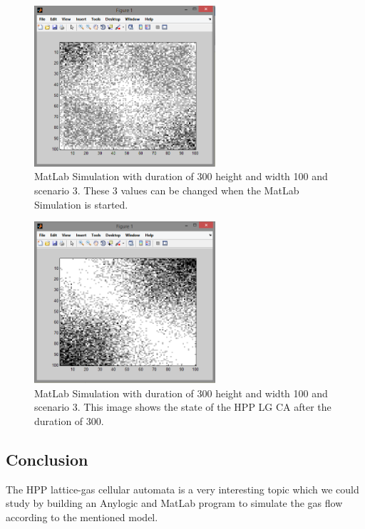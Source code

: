 \documentclass[paper=a4, fontsize=11pt]{scrartcl} %
\numberwithin{equation}{section} %
\numberwithin{figure}{section} %
\numberwithin{table}{section} %
\begin{document}
\begin{figure}[!htp]
	\centering
		\includegraphics[width=0.60\textwidth]{Screenshots/MatLab-300-100-100-3-Start.PNG}
	\caption[MatLab Example 1 - Start]{MatLab Simulation with duration of 300 height and width 100 and scenario 3. These 3 values can be changed when the MatLab Simulation is started.}
	\label{fig:matlab-example1-start}
\end{figure}

\begin{figure}[!htp]
	\centering
		\includegraphics[width=0.60\textwidth]{Screenshots/MatLab-300-100-100-3-End.PNG}
	\caption[MatLab Example 1 - End]{MatLab Simulation with duration of 300 height and width 100 and scenario 3. This image shows the state of the HPP LG CA after the duration of 300.}
	\label{fig:matlab-example1-end}
\end{figure}

\subsection{Conclusion}
The HPP lattice-gas cellular automata is a very interesting topic which we could study by building an Anylogic and MatLab program to simulate the gas flow according to the mentioned model.
\end{document}
